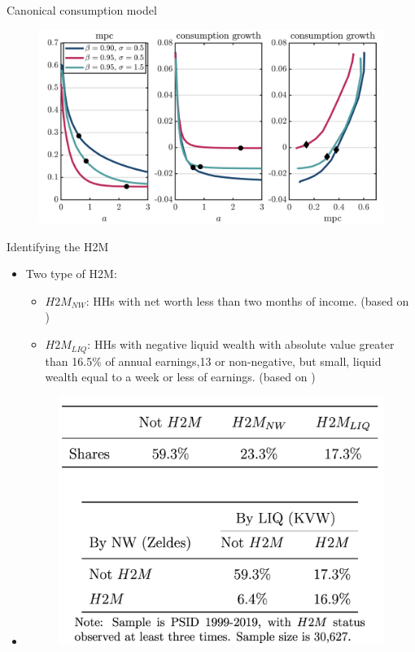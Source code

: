 \documentclass{beamer}
\begin{document}
\begin{frame}{Canonical consumption model}
	\label{canonical}
	\begin{figure}
		\centering
		\includegraphics[width=0.7\linewidth]{Figures/baseline_model.png}
	\end{figure}

\hyperlink{fact2}{}
\end{frame}
\begin{frame}{Identifying the H2M}
	\begin{itemize}
		\item <1-> Two type of H2M:
		\begin{itemize}
			\item<2-> \textit{\textbf{$H2M_{NW}$}}: \footnotesize{HHs with net worth less than two months of income. (based on \cite{zeldes1989consumption})}
			\item<3-> \textit{\textbf{$H2M_{LIQ}$}}: \footnotesize{HHs with negative liquid wealth with absolute value greater than 16.5\% of annual earnings,13 or non-negative, but small, liquid wealth equal to a week or less of earnings. (based on \cite{kaplan2014model})}
		\end{itemize}
		\item<4->[]\begin{figure}
			\centering
			\includegraphics[width=0.5\linewidth]{Figures/Tabel1.png}
		\end{figure}
	\end{itemize}
\end{frame}
\end{document}
